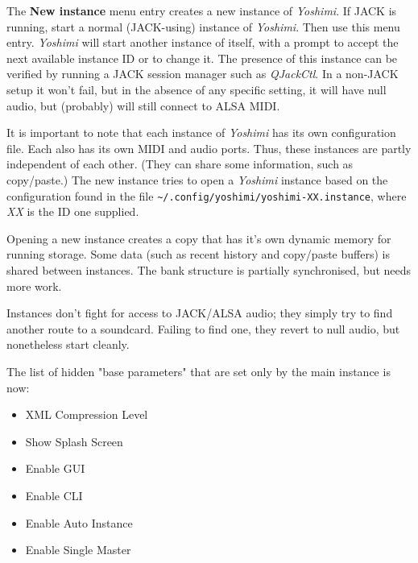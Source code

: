    The \textbf{New instance} menu entry creates a new instance of
   \textsl{Yoshimi}.  If JACK is running, start a normal (JACK-using) instance
   of \textsl{Yoshimi}.  Then use this menu entry.  \textsl{Yoshimi} will start
   another instance of itself, with a prompt to accept the next available
   instance ID or to change it.  The presence of this instance can be verified
   by running a JACK session manager such as \textsl{QJackCtl}.
   In a non-JACK setup it won't fail, but in the absence of any specific
   setting, it will have null audio, but (probably) will still connect to ALSA
   MIDI.

   It is important to note that each instance of \textsl{Yoshimi} has its
   own configuration file.  Each also has its own MIDI and audio ports.
   Thus, these instances are partly independent of each other.
   (They can share some information, such as copy/paste.)
   The new instance tries to open a \textsl{Yoshimi} instance based on the
   configuration found in the file
   \texttt{\textasciitilde/.config/\-yoshimi/\-yoshimi-XX.instance}, where
   \textsl{XX} is the ID one supplied.

   Opening a new instance creates a copy that has it's own dynamic memory for
   running storage. Some data (such as recent history and copy/paste buffers) is
   shared between instances.
   The bank structure is partially synchronised, but needs more work.


   Instances don't fight for access to JACK/ALSA audio; they simply try to
   find another route to a soundcard. Failing to find one, they revert to null
   audio, but nonetheless start cleanly.

   The list of hidden "base parameters" that are set only by the main instance
   is now:

   \begin{itemize}
      \item XML Compression Level
      \item Show Splash Screen
      \item Enable GUI
      \item Enable CLI
      \item Enable Auto Instance
      \item Enable Single Master
   \end{itemize}

